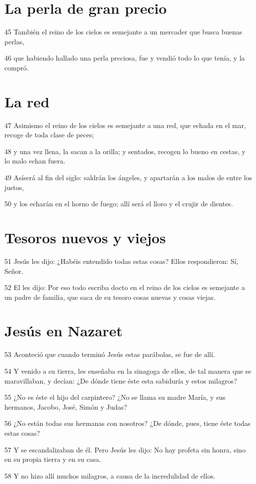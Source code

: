 \section*{La perla de gran precio}

\par 45 También el reino de los cielos es semejante a un mercader que busca buenas perlas,
\par 46 que habiendo hallado una perla preciosa, fue y vendió todo lo que tenía, y la compró.

\section*{La red}

\par 47 Asimismo el reino de los cielos es semejante a una red, que echada en el mar, recoge de toda clase de peces;
\par 48 y una vez llena, la sacan a la orilla; y sentados, recogen lo bueno en cestas, y lo malo echan fuera.
\par 49 Asíserá al fin del siglo: saldrán los ángeles, y apartarán a los malos de entre los justos,
\par 50 y los echarán en el horno de fuego; allí será el lloro y el crujir de dientes.

\section*{Tesoros nuevos y viejos}

\par 51 Jesús les dijo: ¿Habéis entendido todas estas cosas? Ellos respondieron: Sí, Señor.
\par 52 El les dijo: Por eso todo escriba docto en el reino de los cielos es semejante a un padre de familia, que saca de su tesoro cosas nuevas y cosas viejas.

\section*{Jesús en Nazaret}

\par 53 Aconteció que cuando terminó Jesús estas parábolas, se fue de allí.
\par 54 Y venido a su tierra, les enseñaba en la sinagoga de ellos, de tal manera que se maravillaban, y decían: ¿De dónde tiene éste esta sabiduría y estos milagros?
\par 55 ¿No es éste el hijo del carpintero? ¿No se llama su madre María, y sus hermanos, Jacobo, José, Simón y Judas?
\par 56 ¿No están todas sus hermanas con nosotros? ¿De dónde, pues, tiene éste todas estas cosas?
\par 57 Y se escandalizaban de él. Pero Jesús les dijo: No hay profeta sin honra, sino en su propia tierra y en su casa.
\par 58 Y no hizo allí muchos milagros, a causa de la incredulidad de ellos.


